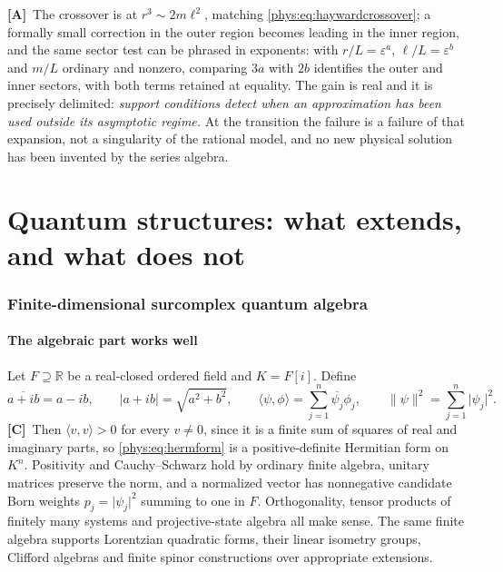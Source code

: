 \documentclass[11pt,letterpaper]{article}
\numberwithin{equation}{section}
\theoremstyle{definition}
\theoremstyle{remark}
\newcommand{\R}{\mathbb R}
\newcommand{\eps}{\varepsilon}
\newcommand{\abs}[1]{\lvert#1\rvert}
\newcommand{\TC}{\textcolor{TierC}{\textsf{\bfseries[C]}}}
\newcommand{\TA}{\textcolor{TierA}{\textsf{\bfseries[A]}}}
\begin{document}
\TA\ The crossover is at $r^{3}\sim2m\ell^{2}$, matching
\eqref{phys:eq:haywardcrossover}; a formally small correction in the outer
region becomes leading in the inner region, and the same sector test can be
phrased in exponents: with $r/L=\eps^{a}$, $\ell/L=\eps^{b}$ and $m/L$ ordinary
and nonzero, comparing $3a$ with $2b$ identifies the outer and inner sectors,
with both terms retained at equality. The gain is real and it is precisely
delimited: \emph{support conditions detect when an approximation has been used
outside its asymptotic regime.} At the transition the failure is a failure of
that expansion, not a singularity of the rational model, and no new physical
solution has been invented by the series algebra.
\part{Quantum structures: what extends, and what does not}
\label{phys:part:quantum}

\section{Finite-dimensional surcomplex quantum algebra}
\label{phys:sec:quantum}

\subsection{The algebraic part works well}
\label{phys:sub:algebra}

Let $F\supseteq\R$ be a real-closed ordered field and $K=F[i]$. Define
\begin{equation}\label{phys:eq:hermform}
\overline{a+ib}=a-ib,\qquad \abs{a+ib}=\sqrt{a^{2}+b^{2}},
\qquad \langle\psi,\phi\rangle=\sum_{j=1}^{n}\overline{\psi_{j}}\phi_{j},
\qquad \lVert\psi\rVert^{2}=\sum_{j=1}^{n}\abs{\psi_{j}}^{2}.
\end{equation}
\TC\ Then $\langle v,v\rangle>0$ for every $v\ne0$, since it is a finite sum of
squares of real and imaginary parts, so \eqref{phys:eq:hermform} is a
positive-definite Hermitian form on $K^{n}$. Positivity and Cauchy--Schwarz
hold by ordinary finite algebra, unitary matrices preserve the norm, and a
normalized vector has nonnegative candidate Born weights
$p_{j}=\abs{\psi_{j}}^{2}$ summing to one in $F$. Orthogonality, tensor
products of finitely many systems and projective-state algebra all make sense.
The same finite algebra supports Lorentzian quadratic forms, their linear
isometry groups, Clifford algebras and finite spinor constructions over
appropriate extensions.
\end{document}
